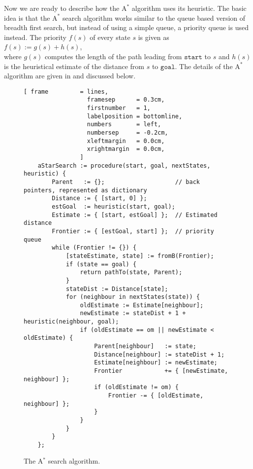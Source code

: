 Now we are ready to describe how the $\mathrm{A}^*$ algorithm uses its heuristic.  The basic idea is that the
$\mathrm{A}^*$ search algorithm works similar to the queue based version of breadth first search, but instead
of using a simple queue, a priority queue is used instead.  The priority $f(s)$ of every state $s$ is given as
\\[0.2cm]
\hspace*{1.3cm}
$f(s) := g(s) + h(s)$,
\\[0.2cm]
where $g(s)$ computes the length of the path leading from $\mathtt{start}$ to $s$ and $h(s)$ is the heuristical
estimate of the distance from $s$ to $\mathtt{goal}$.  The details of the $\mathrm{A}^*$ algorithm are given in
 and discussed below.


\begin{figure}[!ht]
\centering
\begin{Verbatim}[ frame         = lines, 
                  framesep      = 0.3cm, 
                  firstnumber   = 1,
                  labelposition = bottomline,
                  numbers       = left,
                  numbersep     = -0.2cm,
                  xleftmargin   = 0.0cm,
                  xrightmargin  = 0.0cm,
                ]
    aStarSearch := procedure(start, goal, nextStates, heuristic) {
        Parent   := {};                    // back pointers, represented as dictionary
        Distance := { [start, 0] };
        estGoal  := heuristic(start, goal);
        Estimate := { [start, estGoal] };  // Estimated distance
        Frontier := { [estGoal, start] };  // priority queue
        while (Frontier != {}) {
            [stateEstimate, state] := fromB(Frontier);
            if (state == goal) {
                return pathTo(state, Parent);
            }
            stateDist := Distance[state];
            for (neighbour in nextStates(state)) {
                oldEstimate := Estimate[neighbour];
                newEstimate := stateDist + 1 + heuristic(neighbour, goal);
                if (oldEstimate == om || newEstimate < oldEstimate) {
                    Parent[neighbour]   := state;
                    Distance[neighbour] := stateDist + 1;
                    Estimate[neighbour] := newEstimate;
                    Frontier            += { [newEstimate, neighbour] };
                    if (oldEstimate != om) {
                        Frontier -= { [oldEstimate, neighbour] };
                    }
                }
            }
        }
    };
\end{Verbatim}
\vspace*{-0.3cm}
\caption{The A$^*$ search algorithm.}
\label{fig:a-star-search.stlx}
\end{figure}
